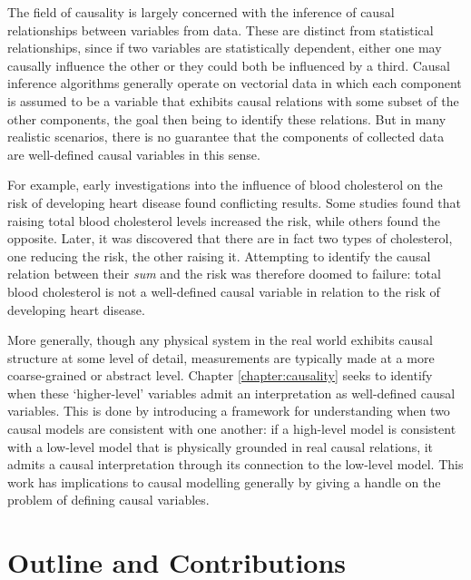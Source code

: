 The field of causality is largely concerned with the inference of causal relationships between variables from data. 
These are distinct from statistical relationships, since if two variables are statistically dependent, either one may causally influence the other or they could both be influenced by a third.
Causal inference algorithms generally operate on vectorial data in which each component is assumed to be a variable that exhibits causal relations with some subset of the other components, the goal then being to identify these relations.
But in many realistic scenarios, there is no guarantee that the components of collected data are well-defined causal variables in this sense.

For example, early investigations into the influence of blood cholesterol on the risk of developing heart disease found conflicting results.
Some studies found that raising total blood cholesterol levels increased the risk, while others found the opposite. 
Later, it was discovered that there are in fact two types of cholesterol, one reducing the risk, the other raising it. 
Attempting to identify the causal relation between their \emph{sum} and the risk was therefore doomed to failure: total blood cholesterol is not a well-defined causal variable in relation to the risk of developing heart disease.

More generally, though any physical system in the real world exhibits causal structure at some level of detail, measurements are typically made at a more coarse-grained or abstract level. 
Chapter \ref{chapter:causality} seeks to identify when these `higher-level' variables admit an interpretation as well-defined causal variables.
This is done by introducing a framework for understanding when two causal models are consistent with one another: if a high-level model is consistent with a low-level model that is physically grounded in real causal relations, it admits a causal interpretation through its connection to the low-level model.
This work has implications to causal modelling generally by giving a handle on the problem of defining causal variables. 




\section{Outline and Contributions}

